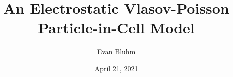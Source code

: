 \documentclass[%
 reprint,
 amsmath,amssymb,
 aps,
]{revtex4-2}
\begin{document}

\title{An Electrostatic Vlasov-Poisson Particle-in-Cell Model}%

\author{Evan Bluhm}




\date{April 21, 2021}%



\maketitle
\end{document}

